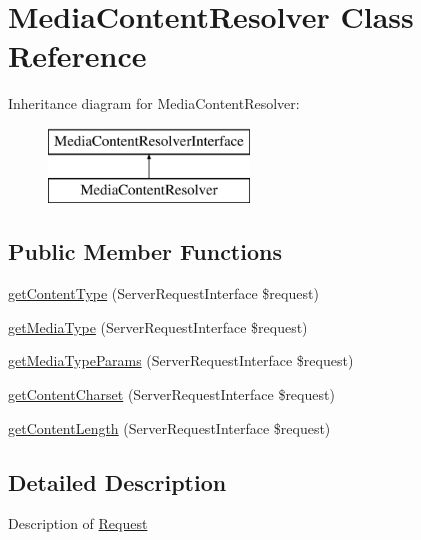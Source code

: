 \hypertarget{class_pes_1_1_http_1_1_request_1_1_media_content_resolver}{}\section{Media\+Content\+Resolver Class Reference}
\label{class_pes_1_1_http_1_1_request_1_1_media_content_resolver}
Inheritance diagram for Media\+Content\+Resolver\+:\begin{figure}[H]
\begin{center}
\leavevmode
\includegraphics[height=2.000000cm]{class_pes_1_1_http_1_1_request_1_1_media_content_resolver}
\end{center}
\end{figure}
\subsection*{Public Member Functions}
\begin{DoxyCompactItemize}
\item 
\mbox{\hyperlink{class_pes_1_1_http_1_1_request_1_1_media_content_resolver_a5e069384f33f60671b832beae5260d9b}{get\+Content\+Type}} (Server\+Request\+Interface \$request)
\item 
\mbox{\hyperlink{class_pes_1_1_http_1_1_request_1_1_media_content_resolver_ae31cd4d8b2526963e57f814b543d2b52}{get\+Media\+Type}} (Server\+Request\+Interface \$request)
\item 
\mbox{\hyperlink{class_pes_1_1_http_1_1_request_1_1_media_content_resolver_af1d02209d81e589acebb7d0afecbe6da}{get\+Media\+Type\+Params}} (Server\+Request\+Interface \$request)
\item 
\mbox{\hyperlink{class_pes_1_1_http_1_1_request_1_1_media_content_resolver_a45eeebc3e157de436ba8b68241de2514}{get\+Content\+Charset}} (Server\+Request\+Interface \$request)
\item 
\mbox{\hyperlink{class_pes_1_1_http_1_1_request_1_1_media_content_resolver_aa5886a7afae000593a639e649d411ca5}{get\+Content\+Length}} (Server\+Request\+Interface \$request)
\end{DoxyCompactItemize}


\subsection{Detailed Description}
Description of \mbox{\hyperlink{class_pes_1_1_http_1_1_request}{Request}}

